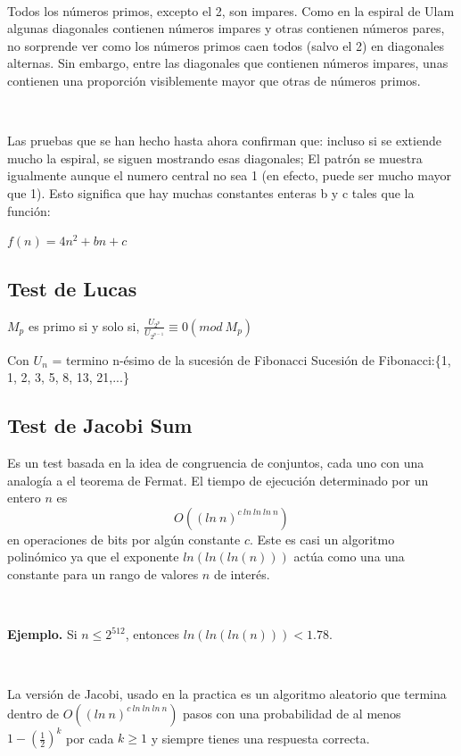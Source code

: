 \documentclass[11pt, conference]{IEEEtran}
\begin{document}
\

Todos los números primos, excepto el 2, son impares. Como en la espiral de Ulam algunas diagonales contienen números impares y otras contienen números pares, no sorprende ver como los números primos caen todos (salvo el 2) en diagonales alternas. Sin embargo, entre las diagonales que contienen números impares, unas contienen una proporción visiblemente mayor que otras de números primos.

\

Las pruebas que se han hecho hasta ahora confirman que: incluso si se extiende mucho la espiral, se siguen mostrando esas diagonales; El patrón se muestra igualmente aunque el numero central no sea 1 (en efecto, puede ser mucho mayor que 1). Esto significa que hay muchas constantes enteras b y c tales que la función:

\begin{center}
	$f(n) = 4n^{2} + bn + c$
\end{center}
\subsection{Test de Lucas}
$M_{p}$ es primo si y solo si, $\frac{U_{2^{p}}}{U_{2^{p-1}}} \equiv 0 (mod\  M_{p})$

Con $U_{n}$ = termino n-ésimo de la sucesión de Fibonacci
Sucesión de Fibonacci:\{1, 1, 2, 3, 5, 8, 13, 21,...\}

\subsection{Test de Jacobi Sum}
Es un test basada en la idea de congruencia de conjuntos, cada uno con una analogía a el teorema de Fermat. El tiempo de ejecución determinado por un entero $n$ es \[O((ln\ n)^{c\ ln\ ln\ ln\ n})\] en operaciones de bits por algún constante $c$. Este es casi un algoritmo polinómico ya que el exponente $ln( ln( ln(n)))$ actúa como una una constante para un rango de valores $n$ de interés.\cite{g}

\

\textbf{Ejemplo.} Si $n \leq 2^{512}$, entonces $ln(ln(ln(n)))<1.78$.

\

La versión de Jacobi, usado en la practica es un algoritmo aleatorio que termina dentro de $O((ln\ n)^{c\ ln\ ln\ ln\ n})$ pasos con una probabilidad de al menos $1-(\frac{1}{2})^{k}$ por cada $k \geq 1$ y siempre tienes una respuesta correcta. 

\
\end{document}

